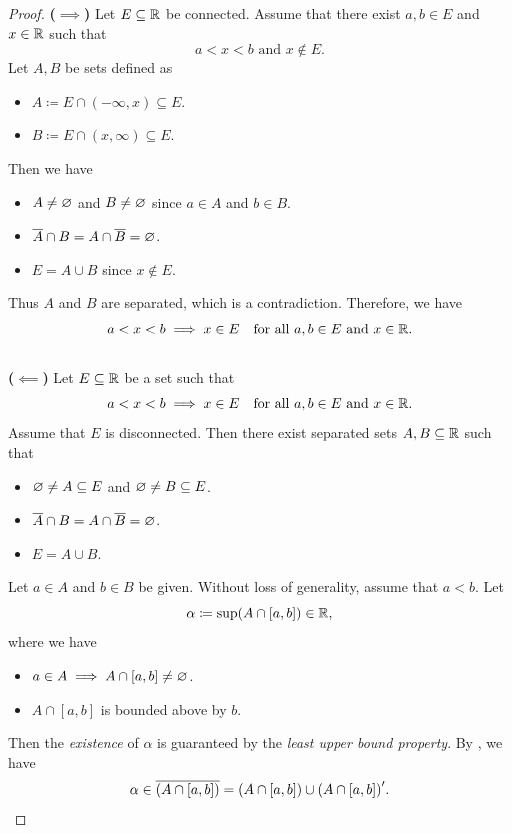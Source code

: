 \begin{proof}
    \textbf{($\implies$)} Let $E \subseteq \mathbb{R}$ be connected. Assume that there exist $a, b \in E$ and $x \in \mathbb{R}$ such that
    \[
    a < x < b \text{ and } x \notin E.
    \]
    Let $A, B$ be sets defined as
    \begin{itemize}
        \item $A \coloneqq E \cap (-\infty, x) \subseteq E$.
        \item $B \coloneqq E \cap (x, \infty) \subseteq E$.
    \end{itemize}
    Then we have
    \begin{itemize}
        \item $A \neq \varnothing$ and $B \neq \varnothing$ since $a \in A$ and $b \in B$.
        \item $\overline{A} \cap B = A \cap \overline{B} = \varnothing$.
        \item $E = A \cup B$ since $x \notin E$.
    \end{itemize}
    Thus $A$ and $B$ are separated, which is a contradiction. Therefore, we have
    \[
    a < x < b \implies x \in E \quad \text{for all } a, b \in E \text{ and } x \in \mathbb{R}.
    \]
    \\[6mm]
    \textbf{($\impliedby$)} Let $E \subseteq \mathbb{R}$ be a set such that
    \[
    a < x < b \implies x \in E \quad \text{for all } a, b \in E \text{ and } x \in \mathbb{R}.
    \]
    Assume that $E$ is disconnected. Then there exist separated sets $A, B \subseteq \mathbb{R}$ such that
    \begin{itemize}
        \item $\varnothing \neq A \subseteq E$ and $\varnothing \neq B \subseteq E$.
        \item $\overline{A} \cap B = A \cap \overline{B} = \varnothing$.
        \item $E = A \cup B$.
    \end{itemize}
    Let $a \in A$ and $b \in B$ be given. Without loss of generality, assume that $a < b$. Let
    \[
    \alpha \coloneqq \sup\paren*{A \cap [a, b]} \in \R,
    \]
    where we have
    \begin{itemize}
        \item $a \in A \implies A \cap [a, b] \neq \varnothing$.
        \item $A \cap [a, b]$ is bounded above by $b$.
    \end{itemize}
    Then the \emph{existence} of $\alpha$ is guaranteed by the \emph{least upper bound property}.
    By , we have
    \[
    \alpha \in \overline{\paren*{A \cap [a, b]}} = \paren*{A \cap [a, b]} \cup \paren*{A \cap [a, b]}'.
\]
\end{proof}

